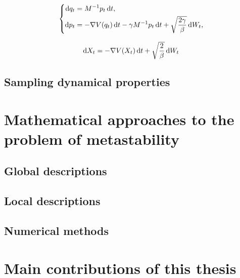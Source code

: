 \begin{equation}
    \left\{
        \begin{aligned}
            \mathrm{d} q_t &= M^{-1}p_t\,\mathrm{d} t,\\ \mathrm{d} p_t &= -\nabla V(q_t)\,\mathrm{d} t - \gamma M^{-1}p_t\,\mathrm{d} t + \sqrt{\frac{2\gamma}{\beta}}\,\mathrm{d} W_t,
        \end{aligned}\right.
\end{equation}

\begin{equation}
    \mathrm{d} X_t = -\nabla V(X_t)\,\mathrm{d} t + \sqrt{\frac{2}{\beta}}\,\mathrm{d} W_t
\end{equation}

\subsection{Sampling dynamical properties}

\section{Mathematical approaches to the problem of metastability}
\subsection{Global descriptions}
\subsection{Local descriptions}
\subsection{Numerical methods}

\section{Main contributions of this thesis}



